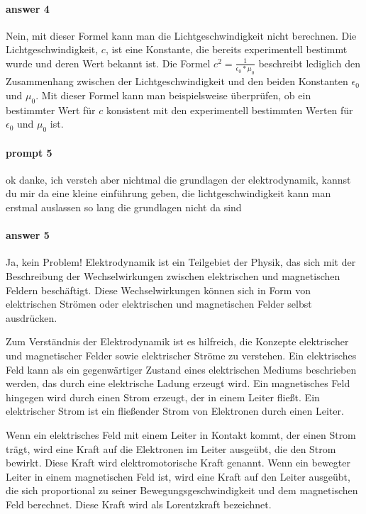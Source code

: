 \documentclass{article}
\begin{document}
\paragraph{answer 4} %
\label{par:answer 4}
Nein, mit dieser Formel kann man die Lichtgeschwindigkeit nicht berechnen. Die
Lichtgeschwindigkeit, $c$, ist eine Konstante, die bereits experimentell
bestimmt wurde und deren Wert bekannt ist. Die Formel $c^2 =
\frac{1}{\epsilon_0 * \mu_0}$ beschreibt lediglich den Zusammenhang zwischen
der Lichtgeschwindigkeit und den beiden Konstanten $\epsilon_0$ und $\mu_0$.
Mit dieser Formel kann man beispielsweise überprüfen, ob ein bestimmter Wert
für $c$ konsistent mit den experimentell bestimmten Werten für $\epsilon_0$ und
$\mu_0$ ist.

\paragraph{prompt 5} %
\label{par:prompt 5paragraph name}
ok danke, ich versteh aber nichtmal die grundlagen der elektrodynamik, kannst
du mir da eine kleine einführung geben, die lichtgeschwindigkeit kann man
erstmal auslassen so lang die grundlagen nicht da sind

\paragraph{answer 5} %
\label{par:answer 5}
Ja, kein Problem! Elektrodynamik ist ein Teilgebiet der Physik, das sich mit
der Beschreibung der Wechselwirkungen zwischen elektrischen und magnetischen
Feldern beschäftigt. Diese Wechselwirkungen können sich in Form von
elektrischen Strömen oder elektrischen und magnetischen Felder selbst
ausdrücken.

Zum Verständnis der Elektrodynamik ist es hilfreich, die Konzepte elektrischer
und magnetischer Felder sowie elektrischer Ströme zu verstehen. Ein
elektrisches Feld kann als ein gegenwärtiger Zustand eines elektrischen Mediums
beschrieben werden, das durch eine elektrische Ladung erzeugt wird. Ein
magnetisches Feld hingegen wird durch einen Strom erzeugt, der in einem Leiter
fließt. Ein elektrischer Strom ist ein fließender Strom von Elektronen durch
einen Leiter.

Wenn ein elektrisches Feld mit einem Leiter in Kontakt kommt, der einen Strom
trägt, wird eine Kraft auf die Elektronen im Leiter ausgeübt, die den Strom
bewirkt. Diese Kraft wird elektromotorische Kraft genannt. Wenn ein bewegter
Leiter in einem magnetischen Feld ist, wird eine Kraft auf den Leiter ausgeübt,
die sich proportional zu seiner Bewegungsgeschwindigkeit und dem magnetischen
Feld berechnet. Diese Kraft wird als Lorentzkraft bezeichnet.
\end{document}
